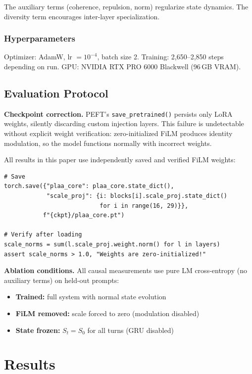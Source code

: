 \documentclass[11pt,a4paper]{article}
\begin{document}
The auxiliary terms (coherence, repulsion, norm) regularize state dynamics. The
diversity term encourages inter-layer specialization.

\subsubsection*{Hyperparameters}

Optimizer: AdamW, lr $= 10^{-4}$, batch size 2. Training: 2,650--2,850 steps
depending on run. GPU: NVIDIA RTX PRO 6000 Blackwell (96\,GB VRAM).

\subsection{Evaluation Protocol}
\label{sec:protocol}

\textbf{Checkpoint correction.} PEFT's \texttt{save\_pretrained()} persists only
LoRA weights, silently discarding custom injection layers. This failure is
undetectable without explicit weight verification: zero-initialized FiLM produces
identity modulation, so the model functions normally with incorrect weights.

All results in this paper use independently saved and verified FiLM weights:

\begin{lstlisting}
# Save
torch.save({"plaa_core": plaa_core.state_dict(),
            "scale_proj": {i: blocks[i].scale_proj.state_dict()
                           for i in range(16, 29)}},
           f"{ckpt}/plaa_core.pt")

# Verify after loading
scale_norms = sum(l.scale_proj.weight.norm() for l in layers)
assert scale_norms > 1.0, "Weights are zero-initialized!"
\end{lstlisting}

\textbf{Ablation conditions.} All causal measurements use pure LM cross-entropy
(no auxiliary terms) on held-out prompts:
\begin{itemize}
  \item \textbf{Trained:} full system with normal state evolution
  \item \textbf{FiLM removed:} scale forced to zero (modulation disabled)
  \item \textbf{State frozen:} $S_t = S_0$ for all turns (GRU disabled)
\end{itemize}

\section{Results}
\end{document}
